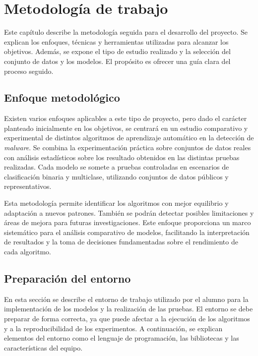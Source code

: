 \chapter{Metodología de trabajo}
\label{ch:metodologia}

Este capítulo describe la metodología seguida para el desarrollo del proyecto. Se explican los enfoques, técnicas y herramientas utilizadas para alcanzar los objetivos. Además, se expone el tipo de estudio realizado y la selección del conjunto de datos y los modelos. El propósito es ofrecer una guía clara del proceso seguido.

\section{Enfoque metodológico}
\label{sec:enfoque}

Existen varios enfoques aplicables a este tipo de proyecto, pero dado el carácter planteado inicialmente en los objetivos, se centrará en un estudio comparativo y experimental de distintos algoritmos de aprendizaje automático en la detección de \textit{malware}. Se combina la experimentación práctica sobre conjuntos de datos reales con análisis estadísticos sobre los resultado obtenidos en las distintas pruebas realizadas. Cada modelo se somete a pruebas controladas en escenarios de clasificación binaria y multiclase, utilizando conjuntos de datos públicos y representativos.

\vspace{1em}

Esta metodología permite identificar los algoritmos con mejor equilibrio y adaptación a nuevos patrones. También se podrán detectar posibles limitaciones y áreas de mejora para futuras investigaciones. Este enfoque proporciona un marco sistemático para el análisis comparativo de modelos, facilitando la interpretación de resultados y la toma de decisiones fundamentadas sobre el rendimiento de cada algoritmo.

\section{Preparación del entorno}
\label{sec:prep_entorno}

En esta sección se describe el entorno de trabajo utilizado por el alumno para la implementación de los modelos y la realización de las pruebas. El entorno se debe preparar de forma correcta, ya que puede afectar a la ejecución de los algoritmos y a la reproducibilidad de los experimentos. A continuación, se explican elementos del entorno como el lenguaje de programación, las bibliotecas y las características del equipo.

